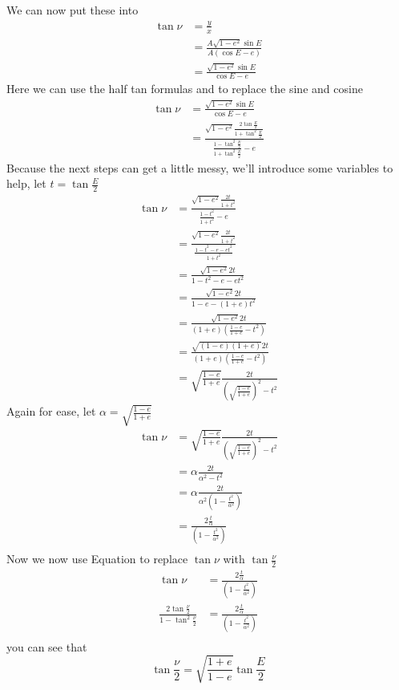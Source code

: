 We can now put these into
\begin{align}
\tan \nu &= \frac{y}{x} \nonumber \\
 &= \frac{A\sqrt{1-e^2} \sin E}{A(\cos E -e)} \nonumber \\
&= \frac{\sqrt{1-e^2} \sin E}{\cos E -e}
\end{align}
Here we can use the half tan formulas  and  to replace the sine and cosine
\begin{align}
\tan \nu &= \frac{\sqrt{1-e^2} \sin E}{\cos E -e} \nonumber \\
 &= \frac{\sqrt{1-e^2} \frac{2 \tan \frac{E}{2}}{1+\tan^2 \frac{E}{2}}}{\frac{1- \tan^2 \frac{E}{2}}{1+\tan^2 \frac{E}{2}} -e}
\end{align}
Because the next steps can get a little messy, we'll introduce some variables to help, let $t = \tan  \frac{E}{2}$
\begin{align}
\tan \nu&= \frac{\sqrt{1-e^2} \frac{2 t}{1+t^2}}{\frac{1- t^2}{1+t^2} -e}\nonumber \\
&= \frac{\sqrt{1-e^2} \frac{2 t}{1+t^2}}{\frac{1- t^2-e -e t^2}{1+t^2}}\nonumber \\
&= \frac{\sqrt{1-e^2} 2 t}{1- t^2-e -e t^2}\nonumber \\
&= \frac{\sqrt{1-e^2} 2 t}{1-e-(1+e)t^2}\nonumber \\
&= \frac{\sqrt{1-e^2} 2 t}{(1+e)\left(\frac{1-e}{1+e}-t^2\right)}\nonumber \\
&= \frac{\sqrt{(1-e)(1+e)} 2 t}{(1+e)\left(\frac{1-e}{1+e}-t^2\right)}\nonumber \\
&= \sqrt{\frac{1-e}{1+e}}\frac{2 t}{\left(\sqrt{\frac{1-e}{1+e}}\right)^2-t^2}
\end{align}
Again for ease, let $\alpha = \sqrt{\frac{1-e}{1+e}}$
\begin{align}
\tan \nu&= \sqrt{\frac{1-e}{1+e}}\frac{2 t}{\left(\sqrt{\frac{1-e}{1+e}}\right)^2-t^2} \nonumber \\
&= \alpha \frac{2 t}{\alpha^2-t^2}\nonumber \\
&= \alpha \frac{2 t}{\alpha^2 \left(1-\frac{t^2}{\alpha^2}\right)}\nonumber \\
&= \frac{2\frac{t}{\alpha}}{ \left(1-\frac{t^2}{\alpha^2}\right)}\nonumber \\
\end{align}
Now we now use Equation  to replace $\tan \nu$ with $\tan \frac{\nu}{2}$
\begin{align}
\tan \nu&= \frac{2\frac{t}{\alpha}}{ \left(1-\frac{t^2}{\alpha^2}\right)}\nonumber \\
\frac{2 \tan \frac{\nu}{2}}{1-\tan^2 \frac{\nu}{2}} &= \frac{2\frac{t}{\alpha}}{ \left(1-\frac{t^2}{\alpha^2}\right)}\nonumber \\
\end{align}
you can see that
\begin{equation}
\tan \frac{\nu}{2} = \sqrt{\frac{1+e}{1-e}}\tan \frac{E}{2} \label{eq:geom2}
\end{equation}
